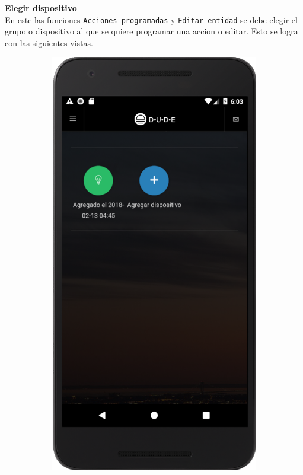 \textbf{Elegir dispositivo}\\
En este las funciones \lstinline[columns=fixed]{Acciones programadas} y \lstinline[columns=fixed]{Editar entidad} se debe elegir el grupo o dispositivo al que se quiere programar una accion o editar. Esto se logra con las siguientes vistas.\\
\begin{figure}[H]
  \centering

  \begin{subfigure}[b]{0.2\textwidth}
    \includegraphics[width=\textwidth, keepaspectratio]{images/app-movil-choose-device}

\end{subfigure}
\end{figure}
